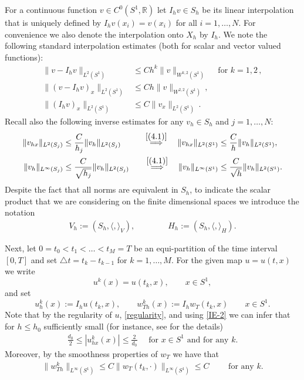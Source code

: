 \documentclass[a4paper,10pt]{article}
\newcommand{\R}{\mathbb{R}}
\numberwithin{equation}{section}
\begin{document}
For a continuous function $v \in C^0 (S^1, \R)$ let $I_h v \in S_h$ be its linear interpolation that is uniquely defined by $I_h v(x_i)= v(x_i)$ for all $i=1, \ldots,N$. For convenience we also denote the interpolation onto $X_h$ by $I_h$. We note the following standard interpolation estimates (both for scalar and vector valued functions):
\begin{align}
\label{(4.2)}
\| v-I_h v \|_{L^2(S^1)} &\leq C h^k \|v \|_{W^{k,2}(S^1)} &\text{ for $k=1,2$}\,,\\
\label{(4.2)bis}
\| (v-I_h v)_x \|_{L^2 (S^1)} & \leq C h \| v \|_{W^{2,2} (S^1)}\,,\\
\label{(4.2)extra}
 \| (I_{h} v)_{x} \|_{L^{2} (S^{1})} & \leq C \| v_{x} \|_{ L^{2}(S^{1})}\, . 
\end{align} 
Recall also the following inverse estimates for any $v_{h} \in S_{h}$ and $j=1, \ldots, N$:
\begin{align}
\| v_{hx} \|_{L^{2}(S_{j})} & \leq \frac{C}{h_{j}} \| v_{h} \|_{L^{2} (S_{j})} & \quad \overset{\eqref{(4.1)}}{\Longrightarrow} \quad \|v_{hx} \|_{L^{2}(S^1)} & \leq \frac{C}{h} \| v_{h} \|_{L^{2} (S^1)}, \label{IE-1} \\
\| v_{h} \|_{L^{\infty} (S_{j})} & \leq \frac{C}{\sqrt{h_{j}}} \| v_{h} \|_{L^{2}(S_{j}) } & \quad \overset{\eqref{(4.1)}}{\Longrightarrow} \quad \| v_{h} \|_{L^{\infty} (S^1)} & \leq \frac{C}{\sqrt{h}} \| v_{h} \|_{L^{2}(S^1)} \label{IE-2}.
\end{align}
Despite the fact that all norms are equivalent in $S_{h}$, to indicate the scalar product that we are considering on the finite dimensional spaces we introduce the notation
\begin{align*}
V_{h}:= (S_{h}, \langle, \rangle_{V}), \qquad \qquad H_{h}:= (S_{h}, \langle, \rangle_{H}).
\end{align*}

Next, let $0=t_{0} < t_{1} < \ldots < t_{M}=T$ be an equi-partition of the time interval $[0,T]$ and set $\triangle t= t_{k}-t_{k-1}$ for $k=1, \ldots, M$.
For the given map $u=u(t,x)$ we write
$$ u^{k}(x)= u(t_{k},x), \qquad x \in S^{1},$$
and set
$$ u_{h}^{k}(x):= I_{h} u(t_{k},x), \qquad w^{k}_{Th}(x):= I_{h} w_{T}(t_{k},x) \qquad x \in S^{1}. $$
Note that by the regularity of $u$, \eqref{regularity}, and using \eqref{IE-2} we can infer that for $h \leq h_{0}$ sufficiently small (for instance, see \cite{PozziStinner2017} for the details)
\begin{align}\label{regularityh}
\frac{d_{0}}{2} \leq |u_{hx}^{k}(x)| \leq \frac{2}{d_{0}} \quad \text{ for } x \in S^{1} \text{ and for any } k.
\end{align} 
Moreover, by the smoothness properties of $w_{T}$ we have that
\begin{align}\label{bound-wth}
\| w^{k}_{Th} \|_{L^{\infty}(S^{1})} \leq C\| w_{T}(t_{k}, \cdot)\|_{L^{\infty}(S^{1})} \leq C \qquad \text{ for any }k.
\end{align}
\end{document}
